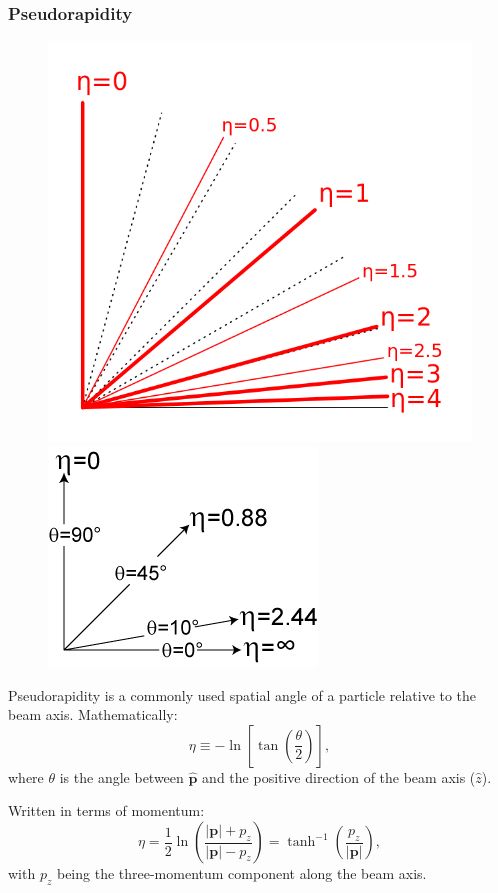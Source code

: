 \documentclass{article}
\begin{document}
\subsubsection{Pseudorapidity}
\begin{figure}
\centering
\begin{minipage}{.5\textwidth}
  \centering
  \includegraphics[width=.65\linewidth]{633px-Pseudorapidity_plot.png}
\end{minipage}%
\begin{minipage}{.5\textwidth}
  \centering
  \includegraphics[width=.65\linewidth]{Pseudorapidity2.png}
\end{minipage}
\end{figure}
Pseudorapidity is a commonly used spatial angle of a particle relative to the beam axis. Mathematically: $$ \eta \equiv - \ln \left[ \tan \left( \frac{\theta}{2} \right) \right], $$ where $\theta$ is the angle between $\hat{\mathbf{p}}$ and the positive direction of the beam axis ($\hat{z}$).

Written in terms of momentum:
\begin{equation}
\label{pseudorapidity}
\eta = \frac{1}{2} \ln \left( \frac{|\mathbf{p}| + p_{z}}{|\mathbf{p}| - p_{z}} \right) = \tanh ^{-1} \left( \frac{p_{z}}{|\mathbf{p}|} \right),
\end{equation}
with $p_{z}$ being the three-momentum component along the beam axis.
\end{document}

